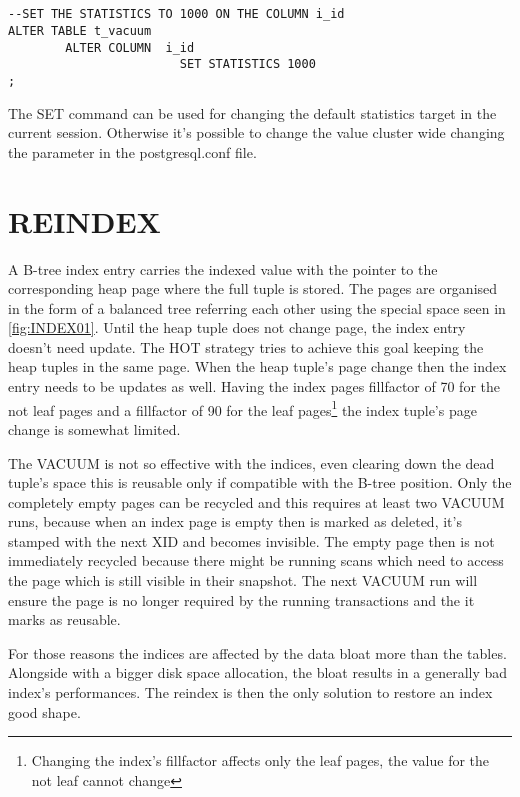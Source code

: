 \begin{lstlisting}[style=pgsql]


--SET THE STATISTICS TO 1000 ON THE COLUMN i_id
ALTER TABLE t_vacuum 
        ALTER COLUMN  i_id 
                        SET STATISTICS 1000
;

\end{lstlisting}

The SET command can be used for changing the default statistics target in the 
current session. Otherwise it's possible to change the value cluster wide changing the parameter 
in the postgresql.conf file.

\section{REINDEX}\label{sec:REINDEX}
A B-tree index entry carries the indexed value with the pointer to the corresponding heap page
where the full tuple is stored. The pages are organised in the form of a balanced tree 
referring each other using the special space seen in \ref{fig:INDEX01}. Until the heap tuple 
does not change page, the index entry doesn't need update. The HOT strategy 
tries to achieve this goal keeping the heap tuples in the same page. When the heap tuple's page 
change then the index entry needs to be updates as well. Having the index pages fillfactor of 70 for 
the not leaf pages and a fillfactor of 90 for the leaf pages\footnote{Changing the index's 
fillfactor affects only 
the leaf pages, the value for the not leaf cannot change} the index tuple's page 
change is somewhat limited.\newline

The VACUUM is not so effective with the indices, even clearing down the dead tuple's space this is 
reusable only if compatible with the B-tree position. Only the completely empty pages can be 
recycled and this requires at least two VACUUM runs, because when an index page is empty 
then is marked as deleted, it's stamped with the next XID and becomes invisible. The empty page 
then is not immediately recycled because there might be running scans which need to access the page 
which is still visible in their snapshot. The next VACUUM run will ensure the page is no longer 
required by the running transactions and the it marks as reusable.\newline

For those reasons the indices are affected by the data bloat more than the tables. Alongside 
with a bigger disk space allocation, the bloat results in a generally bad index's performances. 
The reindex is then the only solution to restore an index good shape.\newline

